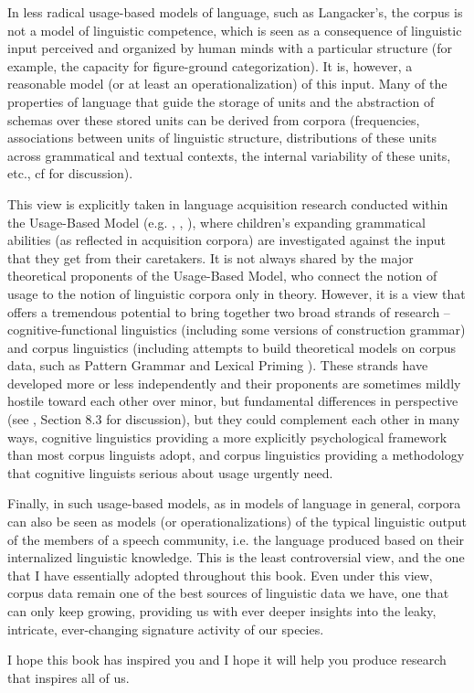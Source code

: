 In less radical usage-based models of language, such as Langacker's, the corpus is not a model of linguistic competence, which is seen as a consequence of linguistic input perceived and organized by human minds with a particular structure (for example, the capacity for figure-ground categorization). It is, however, a reasonable model (or at least an operationalization) of this input. Many of the properties of language that guide the storage of units and the abstraction of schemas over these stored units can be derived from corpora (frequencies, associations between units of linguistic structure, distributions of these units across grammatical and textual contexts, the internal variability of these units, etc., cf \citet{stefanowitsch_corpus-based_2016} for discussion).

This view is explicitly taken in language acquisition research conducted within the Usage-Based Model (e.g. \citealt{tomasello_constructing_2003}, \citealt{dabrowska_formula_2001}, \citealt{diessel_acquisition_2004}), where children's expanding grammatical abilities (as reflected in acquisition corpora) are investigated against the input that they get from their caretakers. It is not always shared by the major theoretical proponents of the Usage-Based Model, who connect the notion of usage to the notion of linguistic corpora only in theory. However, it is a view that offers a tremendous potential to bring together two broad strands of research -- cognitive-functional linguistics (including some versions of construction grammar) and corpus linguistics (including attempts to build theoretical models on corpus data, such as Pattern Grammar \citep{hunston_pattern_2000} and Lexical Priming \citet{hoey_lexical_2005}). These strands have developed more or less independently and their proponents are sometimes mildly hostile toward each other over minor, but fundamental differences in perspective (see \citet{mcenery_corpus_2012}, Section 8.3 for discussion), but they could complement each other in many ways, cognitive linguistics providing a more explicitly psychological framework than most corpus linguists adopt, and corpus linguistics providing a methodology that cognitive linguists serious about usage urgently need.

Finally, in such usage-based models, as in models of language in general, corpora can also be seen as models (or operationalizations) of the typical linguistic output of the members of a speech community, i.e. the language produced based on their internalized linguistic knowledge. This is the least controversial view, and the one that I have essentially adopted throughout this book. Even under this view, corpus data remain one of the best sources of linguistic data we have, one that can only keep growing, providing us with ever deeper insights into the leaky, intricate, ever-changing signature activity of our species.

I hope this book has inspired you and I hope it will help you produce research that inspires all of us.